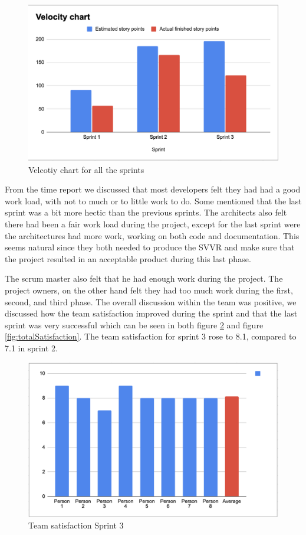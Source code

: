 \documentclass{article}
\begin{document}
\begin{figure}[H]
    \centering
    \includegraphics[scale=0.6]{pfrFigures/Velocity.png}
    \caption{Velcotiy chart for all the sprints}
    \label{fig:Velocity1}
\end{figure}

From the time report we discussed that most developers felt they had had a good work load, with not to much or to little work to do. Some mentioned that the last sprint was a bit more hectic than the previous sprints. The architects also felt there had been a fair work load during the project, except for the last sprint were the architectures had more work, working on both code and documentation. This seems natural since they both needed to produce the SVVR and make sure that the project resulted in an acceptable product during this last phase. 

The scrum master also felt that he had enough work during the project. The project owners, on the other hand felt they had too much work during the first, second, and third phase. The overall discussion within the team was positive, we discussed how the team satisfaction improved during the sprint and that the last sprint was very successful which can be seen in both figure \ref{fig:satisfaction3} and figure \ref{fig:totalSatisfaction}. The team satisfaction for sprint 3 rose to 8.1, compared to 7.1 in sprint 2. 

\begin{figure}[H]
    \centering
    \includegraphics[scale=0.6]{pfrFigures/TeamSatisfactionSprint3.png}
    \caption{Team satisfaction Sprint 3}
    \label{fig:satisfaction3}
\end{figure}
\end{document}

